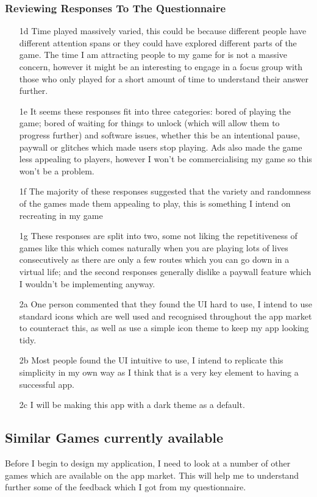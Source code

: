 \subsubsection{Reviewing Responses To The Questionnaire}
\begin{enumerate}
    \item[1d] Time played massively varied, this could be because different people have different attention spans or they could have explored different parts of the game. The time I am attracting people to my game for is not a massive concern, however it might be an interesting to engage in a focus group with those who only played for a short amount of time to understand their answer further.
    \item[1e] It seems these responses fit into three categories: bored of playing the game; bored of waiting for things to unlock (which will allow them to progress further) and software issues, whether this be an intentional pause, paywall or glitches which made users stop playing. Ads also made the game less appealing to players, however I won't be commercialising my game so this won't be a problem.
    \item[1f] The majority of these responses suggested that the variety and randomness of the games made them appealing to play, this is something I intend on recreating in my game
    \item[1g] These responses are split into two, some not liking the repetitiveness of games like this which comes naturally when you are playing lots of lives consecutively as there are only a few routes which you can go down in a virtual life; and the second responses generally dislike a paywall feature which I wouldn’t be implementing anyway.
    \item[2a] One person commented that they found the UI hard to use, I intend to use standard icons which are well used and recognised throughout the app market to counteract this, as well as use a simple icon theme to keep my app looking tidy.
    \item[2b] Most people found the UI intuitive to use, I intend to replicate this simplicity in my own way as I think that is a very key element to having a successful app.
    \item[2c] I will be making this app with a dark theme as a default.
\end{enumerate}

\subsection{Similar Games currently available}
Before I begin to design my application, I need to look at a number of other games which are available on the app market. This will help me to understand further some of the feedback which I got from my questionnaire.
